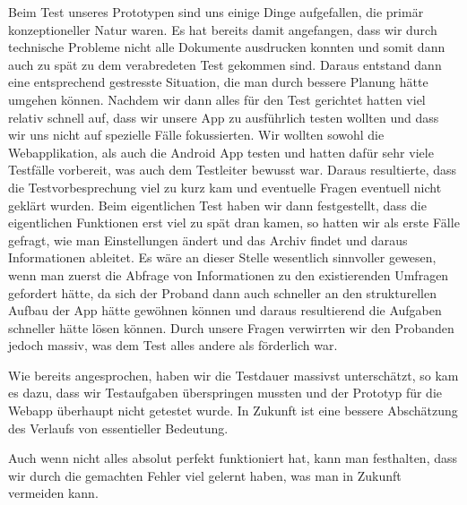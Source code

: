 Beim Test unseres Prototypen sind uns einige Dinge aufgefallen, die primär konzeptioneller Natur waren. Es hat bereits damit angefangen, dass wir durch technische Probleme nicht alle Dokumente ausdrucken konnten und somit dann auch zu spät zu dem verabredeten Test gekommen sind. Daraus entstand dann eine entsprechend gestresste Situation, die man durch bessere Planung hätte umgehen können. 
Nachdem wir dann alles für den Test gerichtet hatten viel relativ schnell auf, dass wir unsere App zu ausführlich testen wollten und dass wir uns nicht auf spezielle Fälle fokussierten. Wir wollten sowohl die Webapplikation, als auch die Android App testen und hatten dafür sehr viele Testfälle vorbereit, was auch dem Testleiter bewusst war. Daraus resultierte, dass die Testvorbesprechung viel zu kurz kam und eventuelle Fragen eventuell nicht geklärt wurden.
Beim eigentlichen Test haben wir dann festgestellt, dass die eigentlichen Funktionen erst viel zu spät dran kamen, so hatten wir als erste Fälle gefragt, wie man Einstellungen ändert und das Archiv findet und daraus Informationen ableitet. Es wäre an dieser Stelle wesentlich sinnvoller gewesen, wenn man zuerst die Abfrage von Informationen zu den existierenden Umfragen gefordert hätte, da sich der Proband dann auch schneller an den strukturellen Aufbau der App hätte gewöhnen können und daraus resultierend die Aufgaben schneller hätte lösen können. Durch unsere Fragen verwirrten wir den Probanden jedoch massiv, was dem Test alles andere als förderlich war.

Wie bereits angesprochen, haben wir die Testdauer massivst unterschätzt, so kam es dazu, dass wir Testaufgaben überspringen mussten und der Prototyp für die Webapp überhaupt nicht getestet wurde. In Zukunft ist eine bessere Abschätzung des Verlaufs von essentieller Bedeutung.

Auch wenn nicht alles absolut perfekt funktioniert hat, kann man festhalten, dass wir durch die gemachten Fehler viel gelernt haben, was man in Zukunft vermeiden kann.

\clearpage